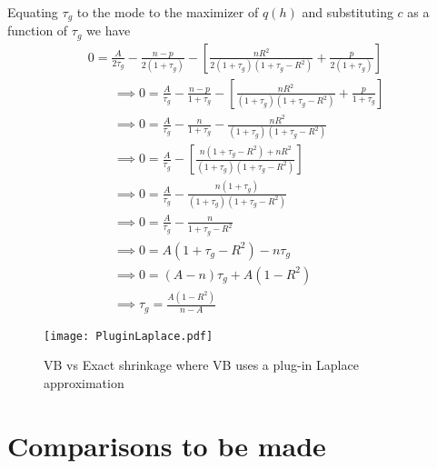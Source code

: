 \documentclass{article}
\def\ds{\displaystyle}
\begin{document}
\noindent Equating $\tau_g$ to the mode to the maximizer of $q(h)$
and substituting $c$ as a function of $\tau_g$
we have
\begin{equation}\label{eq:solveTau}
\begin{array}{l}
\ds 0 = \frac{A}{2\tau_g} - \frac{n-p}{2(1+\tau_g)} - \left[
\frac{nR^2}{2( 1 + \tau_g)( 1 + \tau_g
	-   R^2)} + \frac{p}{2(1 + \tau_g)} 
\right] 
\\
[2ex] 
\ds \qquad \implies
0 = \frac{A}{\tau_g} - \frac{n-p}{1+\tau_g} - \left[
\frac{nR^2}{( 1 + \tau_g)( 1 + \tau_g
	-   R^2)} + \frac{p}{1 + \tau_g}  \right] 
\\
[2ex] 
\ds \qquad \implies
0 = \frac{A}{\tau_g} - \frac{n}{1+\tau_g} - 
\frac{nR^2}{( 1 + \tau_g)( 1 + \tau_g
	-   R^2)}  


\\
[2ex] 
\ds \qquad \implies
0 = \frac{A}{\tau_g} - \left[ \frac{n( 1 + \tau_g
	-   R^2) + nR^2}{(1+\tau_g)( 1 + \tau_g
	-   R^2)}    \right]

\\
[2ex] 
\ds \qquad \implies
0 = \frac{A}{\tau_g} -  \frac{n(1 + \tau_g)
	}{(1+\tau_g)( 1 + \tau_g
	-   R^2)}    

\\
[2ex] 
\ds \qquad \implies
0 = \frac{A}{\tau_g} -  \frac{n
}{ 1 + \tau_g -   R^2}   

\\
[2ex] 
\ds \qquad \implies
0 = A( 1 + \tau_g -   R^2) - n\tau_g 

\\
[2ex] 
\ds \qquad \implies
0 = (A - n)\tau_g  + A(1  -   R^2) 

\\
[2ex] 
\ds \qquad \implies
\tau_g = \frac{A(1  -   R^2)}{n - A} 

\end{array}
\end{equation}
 
\begin{figure}[ht]
	\centering
	\texttt{[image: PluginLaplace.pdf]}
	\caption{VB vs Exact shrinkage where VB uses a plug-in Laplace approximation}
	\label{fig:03}
\end{figure}

\newpage 

\section{Comparisons to be made}
\end{document}
